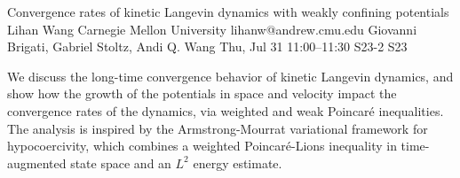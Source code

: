 \begin{talk}
  {Convergence rates of kinetic Langevin dynamics with weakly confining potentials}%
  {Lihan Wang}%
  {Carnegie Mellon University}%
  {lihanw@andrew.cmu.edu}%
  {Giovanni Brigati, Gabriel Stoltz, Andi Q. Wang}%
  {}%
  {Thu, Jul 31 11:00--11:30}%
  {S23-2}%
  {S23}%
  
    
   
We discuss the long-time convergence behavior of kinetic Langevin dynamics, and show how the growth of the potentials in space and velocity impact the convergence rates of the dynamics, via weighted and weak Poincar\'e inequalities. The analysis is inspired by the Armstrong-Mourrat variational framework for hypocoercivity, which combines a weighted Poincar\'e-Lions inequality in time-augmented state space and an $L^2$ energy estimate.


\end{talk}

